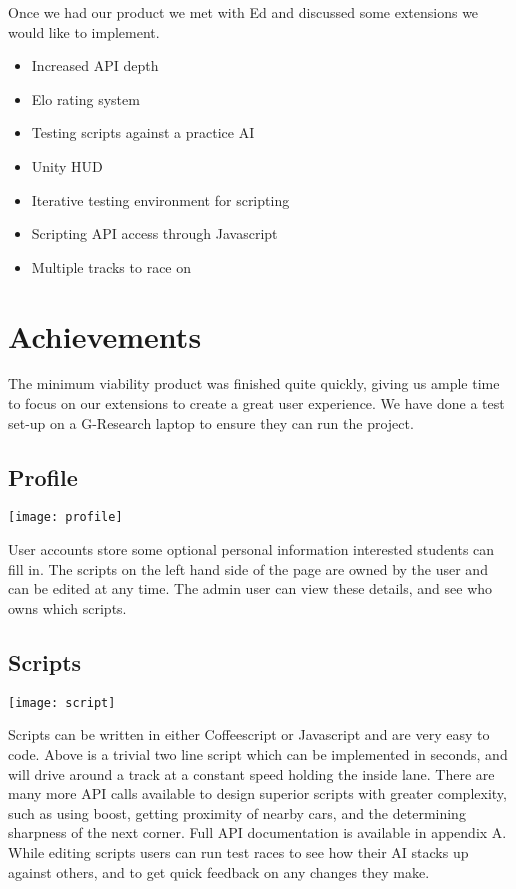 Once we had our product we met with Ed and discussed some extensions we would like to implement.

\begin{itemize}
	\item Increased API depth
	\item Elo rating system
	\item Testing scripts against a practice AI
	\item Unity HUD
	\item Iterative testing environment for scripting
	\item Scripting API access through Javascript
	\item Multiple tracks to race on
\end{itemize}

\section{Achievements}

The minimum viability product was finished quite quickly, giving us ample time to focus on our extensions to create a great user experience. We have done a test set-up on a G-Research laptop to ensure they can run the project.

\subsection{Profile}
\centerline{\texttt{[image: profile]}}
User accounts store some optional personal information interested students can fill in. The scripts on the left hand side of the page are owned by the user and can be edited at any time. The admin user can view these details, and see who owns which scripts.

\subsection{Scripts}
\centerline{\texttt{[image: script]}}
Scripts can be written in either Coffeescript or Javascript and are very easy to code. Above is a trivial two line script which can be implemented in seconds, and will drive around a track at a constant speed holding the inside lane. There are many more API calls available to design superior scripts with greater complexity, such as using boost, getting proximity of nearby cars, and the determining sharpness of the next corner. Full API documentation is available in appendix A. While editing scripts users can run test races to see how their AI stacks up against others, and to get quick feedback on any changes they make.

